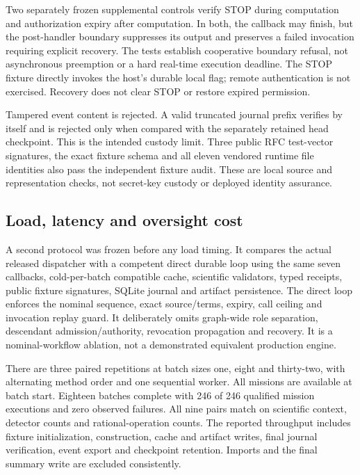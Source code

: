 \documentclass[11pt]{article}
\begin{document}
Two separately frozen supplemental controls verify STOP during computation and authorization expiry after computation. In both, the callback may finish, but the post-handler boundary suppresses its output and preserves a failed invocation requiring explicit recovery. The tests establish cooperative boundary refusal, not asynchronous preemption or a hard real-time execution deadline. The STOP fixture directly invokes the host's durable local flag; remote authentication is not exercised. Recovery does not clear STOP or restore expired permission.

Tampered event content is rejected. A valid truncated journal prefix verifies by itself and is rejected only when compared with the separately retained head checkpoint. This is the intended custody limit. Three public RFC test-vector signatures, the exact fixture schema and all eleven vendored runtime file identities also pass the independent fixture audit. These are local source and representation checks, not secret-key custody or deployed identity assurance.

\subsection{Load, latency and oversight cost}

A second protocol was frozen before any load timing. It compares the actual released dispatcher with a competent direct durable loop using the same seven callbacks, cold-per-batch compatible cache, scientific validators, typed receipts, public fixture signatures, SQLite journal and artifact persistence. The direct loop enforces the nominal sequence, exact source/terms, expiry, call ceiling and invocation replay guard. It deliberately omits graph-wide role separation, descendant admission/authority, revocation propagation and recovery. It is a nominal-workflow ablation, not a demonstrated equivalent production engine.

There are three paired repetitions at batch sizes one, eight and thirty-two, with alternating method order and one sequential worker. All missions are available at batch start. Eighteen batches complete with 246 of 246 qualified mission executions and zero observed failures. All nine pairs match on scientific context, detector counts and rational-operation counts. The reported throughput includes fixture initialization, construction, cache and artifact writes, final journal verification, event export and checkpoint retention. Imports and the final summary write are excluded consistently.
\end{document}
